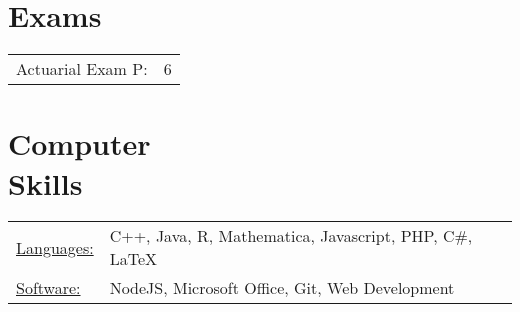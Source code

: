 \documentclass[margin]{res}
\begin{document}
\begin{resume}
\section{Exams}
\begin{tabular}{l p{3in}}
Actuarial Exam P: & 6
\end{tabular}


\section{Computer \\ Skills}
\begin{tabular}{l p{3in}}
\underline{Languages:} & C++, Java, R, Mathematica, 
Javascript, PHP, C\#, \LaTeX \\
\underline{Software:} &  NodeJS, Microsoft Office, Git, Web Development
\end{tabular}

\end{resume} 
\end{document}
